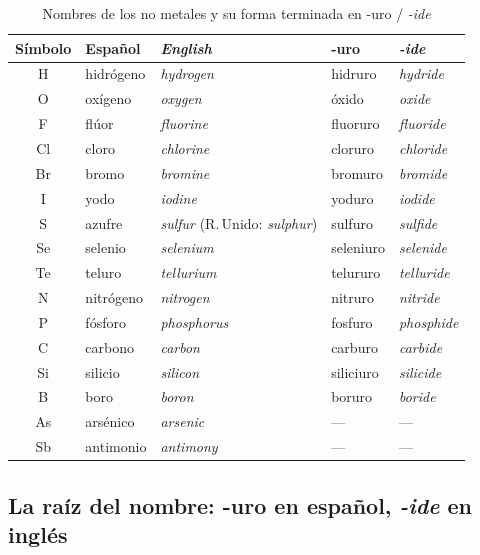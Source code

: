 \documentclass[12pt]{article}
\theoremstyle{mygreennumbox}
\newcommand{\en}[1]{\textit{#1}}
\begin{document}
\begin{table}[H]
    \centering
    \caption{Nombres de los no metales y su forma terminada en -uro / \en{-ide}}
    \vspace{-5pt}
    \begin{tabular}{@{}cllll@{}}
        \toprule
        \textbf{Símbolo} & \textbf{Español} & \textbf{\en{English}} & \textbf{-uro} & \textbf{\en{-ide}} \\
        \midrule
        H & hidrógeno & \en{hydrogen} & hidruro & \en{hydride} \\[3pt]
        O & oxígeno & \en{oxygen} & óxido & \en{oxide} \\[3pt]
        F & flúor & \en{fluorine} & fluoruro & \en{fluoride} \\[3pt]
        Cl & cloro & \en{chlorine} & cloruro & \en{chloride} \\[3pt]
        Br & bromo & \en{bromine} & bromuro & \en{bromide} \\[3pt]
        I & yodo & \en{iodine} & yoduro & \en{iodide} \\[3pt]
        S & azufre & \en{sulfur} (R.\,Unido: \en{sulphur}) & sulfuro & \en{sulfide} \\[3pt]
        Se & selenio & \en{selenium} & seleniuro & \en{selenide} \\[3pt]
        Te & teluro & \en{tellurium} & telururo & \en{telluride} \\[3pt]
        N & nitrógeno & \en{nitrogen} & nitruro & \en{nitride} \\[3pt]
        P & fósforo & \en{phosphorus} & fosfuro & \en{phosphide} \\[3pt]
        C & carbono & \en{carbon} & carburo & \en{carbide} \\[3pt]
        Si & silicio & \en{silicon} & siliciuro & \en{silicide} \\[3pt]
        B & boro & \en{boron} & boruro & \en{boride} \\[3pt]
        As & arsénico & \en{arsenic} & --- & --- \\[3pt]
        Sb & antimonio & \en{antimony} & --- & --- \\
        \bottomrule
    \end{tabular}
    \label{tab:nometales_en}
\end{table}

\subsection{La raíz del nombre: -uro en español, \en{-ide} en inglés}
\end{document}
